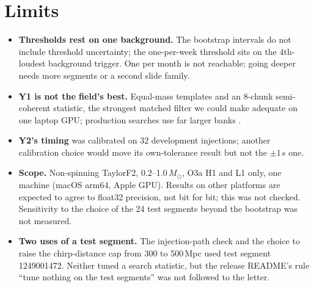 \documentclass[11pt]{article}
\newcommand{\Msun}{\ensuremath{M_\odot}}
\begin{document}
\section{Limits}\label{sec:limits}
\begin{itemize}
\item \textbf{Thresholds rest on one background.} The bootstrap intervals do not include threshold uncertainty; the
one-per-week threshold sits on the 4th-loudest background trigger. One per month is not reachable; going deeper needs
more segments or a second slide family.
\item \textbf{Y1 is not the field's best.} Equal-mass templates and an 8-chunk semi-coherent statistic, the strongest
matched filter we could make adequate on one laptop GPU; production searches use far larger banks
\cite{hanna_bank,kacanja_o4a}.
\item \textbf{Y2's timing} was calibrated on 32 development injections; another calibration choice would move its
own-tolerance result but not the $\pm1$\,s one.
\item \textbf{Scope.} Non-spinning TaylorF2, 0.2--1.0\,\Msun, O3a H1 and L1 only, one machine (macOS arm64, Apple
GPU). Results on other platforms are expected to agree to float32 precision, not bit for bit; this was not checked.
Sensitivity to the choice of the 24 test segments beyond the bootstrap was not measured.
\item \textbf{Two uses of a test segment.} The injection-path check and the choice to raise the chirp-distance cap
from 300 to 500\,Mpc used test segment 1249001472. Neither tuned a search statistic, but the release README's rule
``tune nothing on the test segments'' was not followed to the letter.
\end{itemize}
\end{document}
